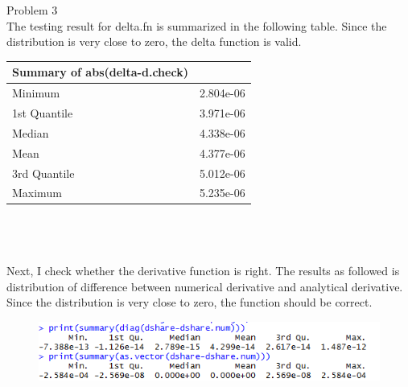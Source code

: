 \documentclass[12pt]{article}
\begin{document}
\newpage
\noindent Problem 3\\
\noindent The testing result for delta.fn is summarized in the following table. Since the distribution is very close to zero, the delta function is valid.  \\
\begin{tabular}{l c  }\hline\hline
Summary of abs(delta-d.check) \\ \hline
Minimum & 2.804e-06 \\
1st Quantile  &  3.971e-06 \\
Median  & 4.338e-06 \\
Mean & 4.377e-06  \\
3rd Quantile  & 5.012e-06 \\
Maximum  & 5.235e-06 \\
\hline
\end{tabular}
\\\\\\
\noindent Next, I check whether the derivative function is right. The results as followed is distribution of difference between numerical derivative and analytical derivative. Since the distribution is very close to zero, the function should be correct. 
\begin{figure}[h!]
  \includegraphics[width=\linewidth]{table1.png}
\end{figure}     
\end{document}
